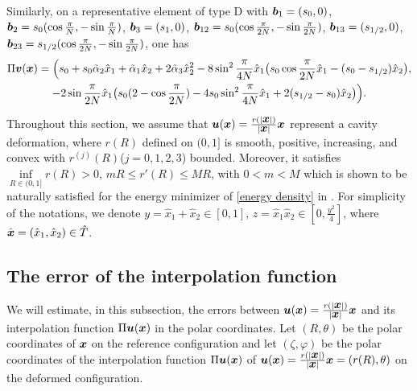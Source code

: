 \documentclass[12pt]{article}
\renewcommand{\vec}[1]{\mbox{\boldmath$#1$}}
\numberwithin{equation}{section}
\begin{document}
Similarly, on a representative element of type D with
$\vec{b}_1=(s_0,0)$, $\vec{b}_2=s_0(\cos{\frac{\pi}{N}},-\sin{\frac{\pi}{N}})$,
$\vec{b}_3=(s_1,0)$,
$\vec{b}_{12}=s_0(\cos{\frac{\pi}{2N}},-\sin{\frac{\pi}{2N}})$,
$\vec{b}_{13}=(s_{1/2},0)$,
$\vec{b}_{23}=s_{1/2}(\cos{\frac{\pi}{2N}},-\sin{\frac{\pi}{2N}})$, one has
\begin{multline}\label{PiD}
\Pi \vec{v}(\vec{x})=\Big(s_0+s_0\tilde{\alpha}_2\hat{x}_1+\tilde{\alpha}_1\hat{x}_2+
2\tilde{\alpha}_3\hat{x}_2^2-8\sin^2{\frac{\pi}{4N}}\hat{x}_1\big(s_0
\cos{\frac{\pi}{2N}}\hat{x}_1-(s_0-s_{1/2})
\hat{x}_2\big),\\
-2\sin{\frac{\pi}{2N}}\hat{x}_1\big(s_0(2-\cos{\frac{\pi}{2N}})
-4s_0\sin^2{\frac{\pi}{4N}}\hat{x}_1+2(s_{1/2}-s_0)\hat{x}_2\big) \Big).
\end{multline}

Throughout this section, we assume that
$\vec{u}(\vec{x})=\frac{r(|\vec{x}|)}{|\vec{x}|}\vec{x}$ represent a cavity deformation,
where $r(R)$ defined on $(0,1]$ is smooth, positive, increasing, and convex with
$r^{(j)}(R)$($j=0, 1, 2, 3$) bounded. Moreover, it satisfies
$\inf\limits_{R\in(0,1]} r(R)>0$, $m R \le r'(R) \le MR$, with $0<m< M$ which
is shown to be naturally satisfied for the energy minimizer of \eqref{energy density}
in \cite{detp}. For simplicity of the notations, we denote $y=\hat{x}_1+\hat{x}_2\in[0,1]$,
$z=\hat{x}_1 \hat{x}_2\in[0,\frac{y^2}{4}]$, where
$\hat{\vec{x}}=(\hat{x}_1,\hat{x}_2)\in \hat{T}$.

\subsection{The error of the interpolation function}
We will estimate, in this subsection, the errors between
$\vec{u}(\vec{x})=\frac{r(|\vec{x}|)}{|\vec{x}|}\vec{x}$ and its interpolation
function $\Pi \vec{u}(\vec{x})$ in the polar coordinates.
Let $(R,\theta)$ be the polar coordinates of $\vec{x}$ on the reference
configuration and let $(\zeta,\varphi)$ be the polar coordinates of the
interpolation function $\Pi \vec{u}(\vec{x})$ of
$\vec{u}(\vec{x})=\frac{r(|\vec{x}|)}{|\vec{x}|}\vec{x}=(r(R),\theta)$ on
the deformed configuration.
\end{document}
